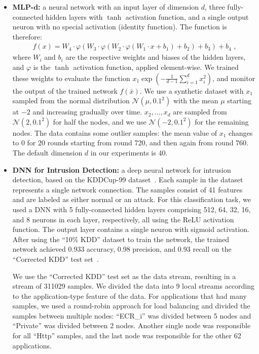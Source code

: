 \begin{itemize}[noitemsep, leftmargin=*]


\item \textbf{MLP-}$\bm{d}$\textbf{:}
a neural network with an input layer of dimension $d$, three fully-connected hidden layers with $\tanh$ activation function, and a single output neuron with no special activation (identity function).
The function is therefore:
\begin{align*}
    f(x) =
    W_4 \cdot \varphi \left( W_3 \cdot \varphi \left( W_2 \cdot \varphi \left( W_1 \cdot x  + b_1  \right) + b_2  \right) + b_3 \right) + b_4 \text{~,}
\end{align*}
where $W_i$ and $b_i$ are the respective weights and biases of the hidden layers, and $\varphi$ is the $\tanh$ activation function, applied element-wise.
We trained these weights to evaluate the function  $x_1 \exp \left( - \frac{1}{d-1} \sum_{i=1}^{d}x_i^2 \right)$, and monitor the output of the trained network $f(\bar{x})$.
%
We use a synthetic dataset with $x_1$ sampled from the normal distribution $\mathcal{N}(\mu, 0.1^2)$ with the mean $\mu$ starting at $-2$ and increasing gradually over time.
$x_2, ..., x_d$ are sampled from $\mathcal{N}(2, 0.1^2)$ for half the nodes, and we use $\mathcal{N}(-2, 0.1^2)$ for the remaining nodes.
The data contains some outlier samples:
the mean value of $x_1$ changes to 0 for 20 rounds starting from round 720, and then again from round 760.
The default dimension $d$ in our experiments is 40.






\item \textbf{DNN for Intrusion Detection:}
a deep neural network for intrusion detection, based on the KDDCup-99 dataset~\cite{kddcup99}.
Each sample in the dataset represents a single network connection.
The samples consist of 41 features and are labeled as either normal or an attack.
For this classification task, we used a DNN with 5 fully-connected hidden layers comprising 512, 64, 32, 16, and 8 neurons in each layer, respectively, all using the ReLU activation function.
The output layer contains a single neuron with sigmoid activation.
After using the ``10\% KDD'' dataset to train the network, the trained network achieved 0.933 accuracy, 0.98 precision, and 0.93 recall on the ``Corrected KDD'' test set~\cite{kayacik2005selecting}.

We use the ``Corrected KDD'' test set as the data stream, resulting in a stream of 311029 samples.
%
We divided the data into 9 local streams according to the application-type feature of the data.
For applications that had many samples, we used a round-robin approach for load balancing and divided the samples between multiple nodes: ``ECR\_i'' was divided between 5 nodes and ``Private'' was divided between 2 nodes.
Another single node was responsible for all ``Http'' samples, and the last node was responsible for the other 62 applications.




\end{itemize}
